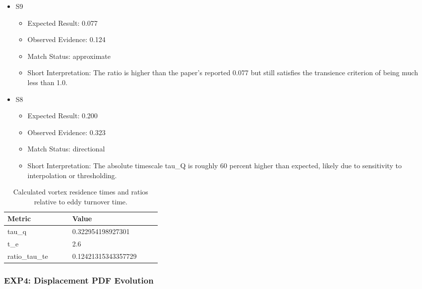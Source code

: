 \documentclass[11pt]{article}
\begin{document}
\begin{itemize}

\item S9

\begin{itemize}

\item Expected Result: 0.077

\item Observed Evidence: 0.124

\item Match Status: approximate

\item Short Interpretation: The ratio is higher than the paper's reported 0.077 but still satisfies the transience criterion of being much less than 1.0.

\end{itemize}

\item S8

\begin{itemize}

\item Expected Result: 0.200

\item Observed Evidence: 0.323

\item Match Status: directional

\item Short Interpretation: The absolute timescale tau\_Q is roughly 60 percent higher than expected, likely due to sensitivity to interpolation or thresholding.

\end{itemize}

\end{itemize}

\begin{longtable}{p{0.18\linewidth}|p{0.18\linewidth}}
\caption{Calculated vortex residence times and ratios relative to eddy turnover time.}\\
\hline
Metric & Value \\
\hline
tau\_q & 0.322954198927301 \\
t\_e & 2.6 \\
ratio\_tau\_te & 0.12421315343357729 \\
\hline
\end{longtable}

\subsubsection*{EXP4: Displacement PDF Evolution}
\end{document}
